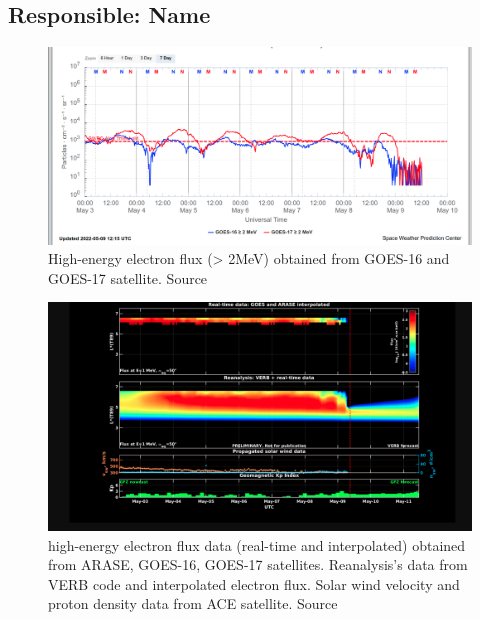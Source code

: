 \documentclass[a4paper, 10pt]{article}
\begin{document}
 \subsection{Responsible: Name} 
 
\begin{figure}[H]
    
                        \centering
   
                             \includegraphics[width=14cm]{./figures//figureRadBelts_0.png}

                             \caption{ High-energy electron flux (> 2MeV) obtained from GOES-16 and GOES-17 satellite. Source}
                        \end{figure}

                     \begin{figure}[H]
    
                        \centering
   
                             \includegraphics[width=14cm]{./figures//figureRadBelts_1.png}

                             \caption{ high-energy electron flux data (real-time and interpolated) obtained from ARASE, GOES-16, GOES-17 satellites. Reanalysis’s data from VERB code and interpolated electron flux. Solar wind velocity and proton density data from ACE satellite. Source}
                        \end{figure}
\end{document}
